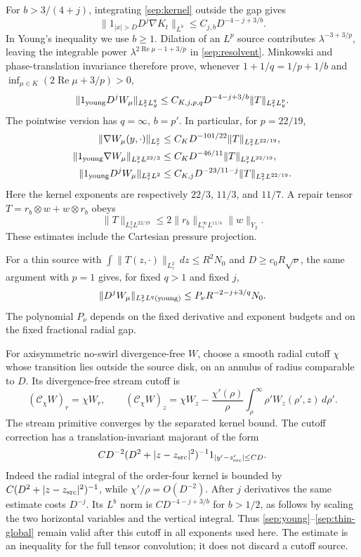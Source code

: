 For $b>3/(4+j)$, integrating \eqref{sep:kernel} outside the gap gives
\[
 \|1_{|x|>D}D^j\nabla K_t\|_{L^b}
       \le C_{j,b}D^{-4-j+3/b}.
\]
In Young's inequality we use $b\ge1$. Dilation of an $L^p$ source
contributes $\lambda^{-3+3/p}$, leaving the integrable power
$\lambda^{2\operatorname{Re}\mu-1+3/p}$ in
\eqref{sep:resolvent}. Minkowski and phase-translation invariance
therefore prove, whenever $1+1/q=1/p+1/b$ and
$\inf_{\mu\in K}(2\operatorname{Re}\mu+3/p)>0$,
\begin{equation}\label{sep:young}
 \|1_{\rm young}D^jW_\mu\|_{L^2_\tau L^q_y}
 \le C_{K,j,p,q}D^{-4-j+3/b}
                   \|T\|_{L^2_\tau L^p_y}.
\end{equation}
The pointwise version has $q=\infty$, $b=p'$.
In particular, for $p=22/19$,
\begin{align}
 \|\nabla W_\mu(y,\cdot)\|_{L^2_\tau}
   &\le C_KD^{-101/22}\|T\|_{L^2_\tau L^{22/19}},\label{sep:repair-point}\\
 \|1_{\rm young}\nabla W_\mu\|_{L^2_\tau L^{22/3}}
   &\le C_KD^{-46/11}\|T\|_{L^2_\tau L^{22/19}},\label{sep:repair-global}\\
 \|1_{\rm young}D^jW_\mu\|_{L^2_\tau L^2}
   &\le C_{K,j}D^{-23/11-j}\|T\|_{L^2_\tau L^{22/19}}.
 \label{sep:repair-energy}
\end{align}
Here the kernel exponents are respectively $22/3$, $11/3$, and
$11/7$. A repair tensor $T=r_b\otimes w+w\otimes r_b$ obeys
\[
 \|T\|_{L^2_\tau L^{22/19}}
 \le2\|r_b\|_{L^\infty_\tau L^{11/4}}\|w\|_{Y_2}.
\]
These estimates include the Cartesian pressure projection.

For a thin source with
$\int\|T(z,\cdot)\|_{L^2_\tau}\,dz\le R^2N_0$ and
$D\ge c_0R\sqrt\nu$, the same argument with $p=1$ gives, for
fixed $q>1$ and fixed $j$,
\begin{equation}\label{sep:thin-global}
 \|D^jW_\mu\|_{L^2_\tau L^q(\rm young)}
       \le P_\nu R^{-2-j+3/q}N_0.
\end{equation}
The polynomial $P_\nu$ depends on the fixed derivative and exponent
budgets and on the fixed fractional radial gap.

For axisymmetric no-swirl divergence-free $W$, choose a smooth radial
cutoff $\chi$ whose transition lies outside the source disk, on an
annulus of radius comparable to $D$. Its divergence-free stream cutoff is
\[
 (\mathcal C_\chi W)_r=\chi W_r,\qquad
 (\mathcal C_\chi W)_z=\chi W_z-
  \frac{\chi'(\rho)}\rho\int_\rho^\infty\rho'W_z(\rho',z)\,d\rho'.
\]
The stream primitive converges by the separated kernel bound.
The cutoff correction has a translation-invariant majorant of the form
\[
 C D^{-2}(D^2+|z-z_{\rm src}|^2)^{-1}
       1_{|y'-z'_{\rm src}|\le CD}.
\]
Indeed the radial integral of the order-four kernel is bounded by
$C(D^2+|z-z_{\rm src}|^2)^{-1}$, while $\chi'/\rho=O(D^{-2})$.
After $j$ derivatives the same estimate costs $D^{-j}$.
Its $L^b$ norm is $CD^{-4-j+3/b}$ for $b>1/2$, as follows by
scaling the two horizontal variables and the vertical integral.
Thus \eqref{sep:young}--\eqref{sep:thin-global} remain valid after
this cutoff in all exponents used here. The estimate is an inequality
for the full tensor convolution; it does not discard a cutoff source.

